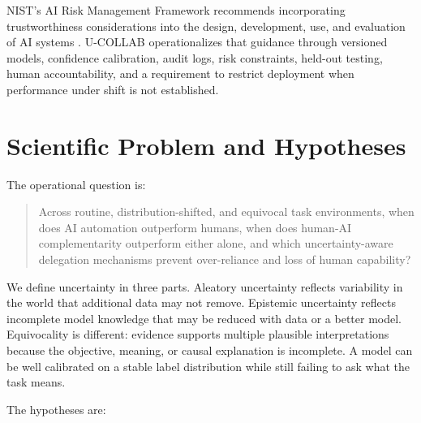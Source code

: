 \documentclass[conference]{IEEEtran}
\begin{document}
NIST's AI Risk Management Framework recommends incorporating trustworthiness considerations into the design, development, use, and evaluation of AI systems \cite{nist2023}. U-COLLAB operationalizes that guidance through versioned models, confidence calibration, audit logs, risk constraints, held-out testing, human accountability, and a requirement to restrict deployment when performance under shift is not established.

\section{Scientific Problem and Hypotheses}

The operational question is:

\begin{quote}
Across routine, distribution-shifted, and equivocal task environments, when does AI automation outperform humans, when does human-AI complementarity outperform either alone, and which uncertainty-aware delegation mechanisms prevent over-reliance and loss of human capability?
\end{quote}

We define uncertainty in three parts. Aleatory uncertainty reflects variability in the world that additional data may not remove. Epistemic uncertainty reflects incomplete model knowledge that may be reduced with data or a better model. Equivocality is different: evidence supports multiple plausible interpretations because the objective, meaning, or causal explanation is incomplete. A model can be well calibrated on a stable label distribution while still failing to ask what the task means.

The hypotheses are:
\end{document}
